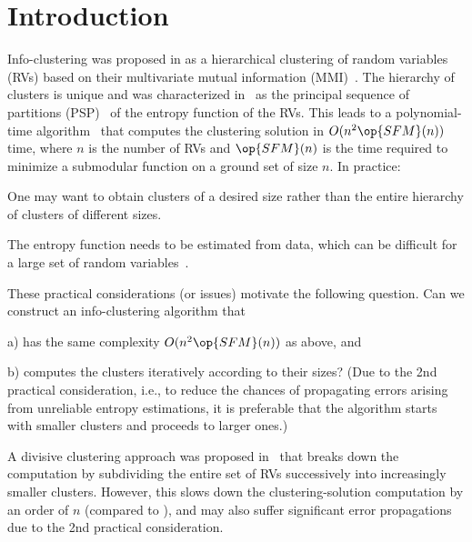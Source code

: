 \section{Introduction}
\label{sec:introduction}


Info-clustering was proposed in \cite{chan16cluster} as a hierarchical
clustering of random variables (RVs) based on their multivariate mutual information (MMI)~\cite{chan15mi}.
The hierarchy of clusters is unique and was characterized in~\cite{chan16cluster} as the principal 
sequence of partitions (PSP)~\cite{narayanan90} of the entropy function of the RVs.  This leads to a
polynomial-time algorithm~\cite[Algorithm~3]{chan16cluster} that computes the clustering solution in
$O(n^2 \op{SFM}(n))$ time, where $n$ is the number of RVs and $\op {SFM}(n)$ is the time required to
minimize a submodular function on a ground set of size $n$. In practice:
\begin{inparaenum}
	\item One may want to obtain clusters of a desired size rather than the entire hierarchy of clusters
	of different sizes. 
	\item The entropy function needs to be estimated from data, which can be
	difficult for a large set of random variables~\cite{wu16}. 
\end{inparaenum}
These practical considerations (or issues) motivate the following question. Can we construct an info-clustering
algorithm that
\begin{inparaenum}
\item[a)] has the same complexity $O(n^2 \op{SFM}(n))$ as above, and
\item[b)] computes the clusters iteratively according to their sizes? (Due to the 2nd practical
		consideration, i.e., to reduce the chances of propagating errors arising from unreliable
		entropy estimations,  it is preferable that the algorithm starts with smaller clusters and proceeds to larger ones.)
\end{inparaenum}

A divisive
clustering approach was proposed in~\cite[Algorithms~1 \& 2]{chan16cluster} that breaks down the
computation by subdividing the entire set of RVs successively into increasingly smaller clusters.
However, this slows down the clustering-solution computation by an order of $n$ (compared to \cite[Algorithm~3]{chan16cluster}),
and may also suffer significant error propagations due to the 2nd practical consideration.

